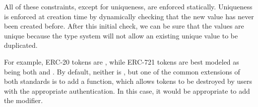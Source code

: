 \documentclass[dvipsnames, usenames, sigconf]{acmart}
\begin{document}
All of these constraints, except for uniqueness, are enforced statically.
Uniqueness is enforced at creation time by dynamically checking that the new value has never been created before.
After this initial check, we can be sure that the values are unique because the type system will not allow an existing unique value to be duplicated.

For example, ERC-20 tokens are , while ERC-721 tokens are best modeled as being both  and .
By default, neither is , but one of the common extensions of both standards is to add a  function, which allows tokens to be destroyed by users with the appropriate authentication.
In this case, it would be appropriate to add the  modifier.
\end{document}
